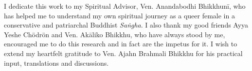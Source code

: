 \vspace{\fill}
\clearpage
\bigskip

\small I dedicate this work to my Spiritual Advisor, Ven. Anandabodhi Bhikkhunī, who has helped me to understand my own spiritual journey as a queer female in a conservative and patriarchal Buddhist {\em Saṅgha}. I also thank my good friends Ayya Yeshe Chödrön and Ven. Akāliko Bhikkhu, who have always stood by me, encouraged me to do this research and in fact are the impetus for it. I wish to extend my heartfelt gratitude to Ven. Ajahn Brahmali Bhikkhu for his practical input, translations and discussions.
